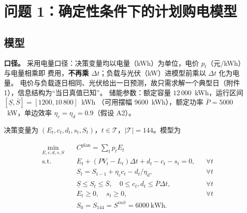 
\section{问题 1：确定性条件下的计划购电模型}\label{chap:q1}

\subsection{模型}

\textbf{口径。} 采用电量口径：决策变量均以电量（kWh）为单位，电价 \(p_t\)（元/kWh）与电量相乘即
费用，\textbf{不再乘 \(\Delta t\)}；负载与光伏（kW）进模型前乘以 \(\Delta t\) 化为电量。
电价与负载逐日相同、光伏给出一日预测，故只需求解一个典型日（附件 1），信息结构为“当日真值已知”。
储能参数：额定容量 \(12\,000\)~kWh，运行区间 \([\underline S,\overline S]=[1200,10\,800]\)~kWh
（可用摆幅 9600~kWh），额定功率 \(\overline P=5000\)~kW，单边效率 \(\eta_c=\eta_d=0.9\)（假设 A2）。

决策变量为 \((E_t,c_t,d_t,s_t,S_t)\)，\(t\in\mathcal T\)，\(|\mathcal T|=144\)。模型为

\begin{subequations}\label{eq:q1-model}
\begin{align}
  \min_{E,c,d,s,S}\quad & C^{\text{plan}}=\sum_{t}p_tE_t \label{eq:q1-obj}\\
  \text{s.t.}\quad
  & E_t+(PV_t-L_t)\Delta t+d_t-c_t-s_t=0, && \forall t \label{eq:q1-balance}\\
  & S_t=S_{t-1}+\eta_c c_t-d_t/\eta_d, && \forall t \label{eq:q1-soc}\\
  & \underline S\le S_t\le\overline S,\quad 0\le c_t,d_t\le \overline P\Delta t, && \forall t \label{eq:q1-socbound}\\
  & E_t\ge0,\quad s_t\ge0, && \forall t \label{eq:q1-nonneg}\\
  & S_0=S_{144}=S^{init}=6000\ \text{kWh}. \label{eq:q1-periodic}
\end{align}
\end{subequations}

